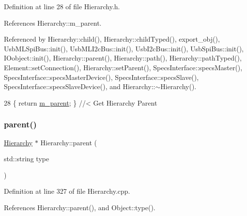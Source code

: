 Definition at line 28 of file Hierarchy.\+h.



References Hierarchy\+::m\+\_\+parent.



Referenced by Hierarchy\+::child(), Hierarchy\+::child\+Typed(), export\+\_\+obj(), Usb\+M\+L\+Spi\+Bus\+::init(), Usb\+M\+L\+I2c\+Bus\+::init(), Usb\+I2c\+Bus\+::init(), Usb\+Spi\+Bus\+::init(), I\+Oobject\+::init(), Hierarchy\+::parent(), Hierarchy\+::path(), Hierarchy\+::path\+Typed(), Element\+::set\+Connection(), Hierarchy\+::set\+Parent(), Specs\+Interface\+::specs\+Master(), Specs\+Interface\+::specs\+Master\+Device(), Specs\+Interface\+::specs\+Slave(), Specs\+Interface\+::specs\+Slave\+Device(), and Hierarchy\+::$\sim$\+Hierarchy().


\begin{DoxyCode}
28 \{ \textcolor{keywordflow}{return} \hyperlink{classHierarchy_a5814bb280d4e8539ab25ab6cbfb9cc4f}{m\_parent}; \}  \textcolor{comment}{//< Get Hierarchy Parent}
\end{DoxyCode}
\mbox{\label{classHierarchy_ad550588733bf75ac5c0fcfd7c8fd11a6}} 
\subsubsection{\texorpdfstring{parent()}{parent()}\hspace{0.1cm}{\footnotesize\ttfamily [2/2]}}
{\footnotesize\ttfamily \hyperlink{classHierarchy}{Hierarchy} $\ast$ Hierarchy\+::parent (\begin{DoxyParamCaption}\item[{std\+::string}]{type }\end{DoxyParamCaption})\hspace{0.3cm}{\ttfamily [inherited]}}



Definition at line 327 of file Hierarchy.\+cpp.



References Hierarchy\+::parent(), and Object\+::type().


